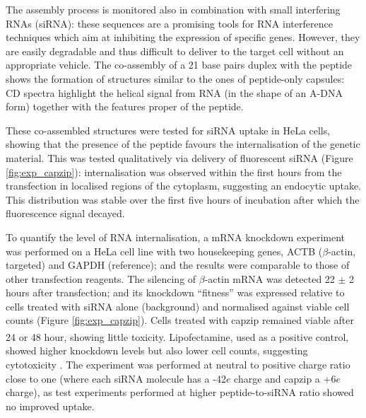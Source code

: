 The assembly process is monitored also in combination with small interfering RNAs (siRNA): these sequences are a promising tools for RNA interference techniques which aim at inhibiting the expression of specific genes. However, they are easily degradable and thus difficult to deliver to the target cell without an appropriate vehicle.
%
The co-assembly of a 21 base pairs duplex with the peptide shows the formation of structures similar to the ones of peptide-only capsules: CD spectra highlight the helical signal from RNA (in the shape of an A-DNA form) together with the features proper of the peptide.

These co-assembled structures were tested for siRNA uptake in HeLa cells, showing that the presence of the peptide favours the internalisation of the genetic material. This was tested qualitatively via delivery of fluorescent siRNA (Figure \ref{fig:exp_capzip}): internalisation was observed within the first hours from the transfection in localised regions of the cytoplasm, suggesting an endocytic uptake. This distribution was stable over the first five hours of incubation after which the fluorescence signal decayed.

To quantify the level of RNA internalisation, a mRNA knockdown experiment was performed on a HeLa cell line with two housekeeping genes, ACTB ($\beta$-actin, targeted) and GAPDH (reference)\cite{Crombez2009}; and the results were comparable to those of other transfection reagents\cite{Bustin2009}.
%
The silencing of $\beta$-actin mRNA was detected 22 $\pm$ 2 hours after transfection; and its knockdown ``fitness” was expressed relative to cells treated with siRNA alone (background) and normalised against viable cell counts (Figure \ref{fig:exp_capzip}). Cells treated with capzip remained viable after 24 or 48 hour, showing little toxicity.
%
Lipofectamine\textsuperscript{\textregistered}, used as a positive control, showed higher knockdown levels but also lower cell counts, suggesting cytotoxicity \cite{Elsabahy2013}.
%
The experiment was performed at neutral to positive charge ratio close to one (where each siRNA molecule has a -42$e$ charge and capzip a +6$e$ charge), as test experiments performed at higher peptide-to-siRNA ratio showed no improved uptake.

